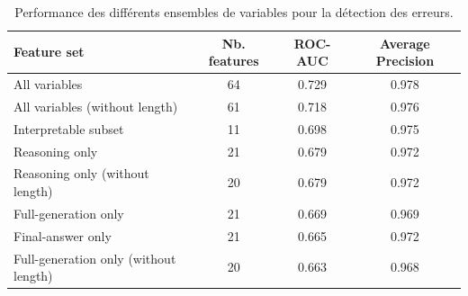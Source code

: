 \begin{table}[htbp]
\centering
\caption{Performance des différents ensembles de variables pour la détection des erreurs.}
\label{tab:logprob_model_summary}
\begin{tabular}{lccc}
\toprule
Feature set & Nb. features & ROC-AUC & Average Precision \\
\midrule
All variables & 64 & 0.729 & 0.978 \\
All variables (without length) & 61 & 0.718 & 0.976 \\
Interpretable subset & 11 & 0.698 & 0.975 \\
Reasoning only & 21 & 0.679 & 0.972 \\
Reasoning only (without length) & 20 & 0.679 & 0.972 \\
Full-generation only & 21 & 0.669 & 0.969 \\
Final-answer only & 21 & 0.665 & 0.972 \\
Full-generation only (without length) & 20 & 0.663 & 0.968 \\
\bottomrule
\end{tabular}

\end{table}
